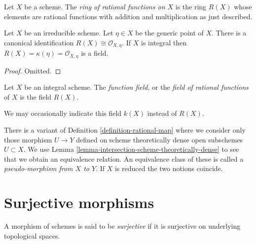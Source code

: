 \begin{definition}
\label{definition-ring-of-rational-functions}
Let $X$ be a scheme. The {\it ring of rational functions on $X$}
is the ring $R(X)$ whose elements are rational functions with
addition and multiplication as just described.
\end{definition}

\begin{lemma}
\label{lemma-integral-scheme-rational-functions}
Let $X$ be an irreducible scheme. Let $\eta \in X$ be the generic point
of $X$. There is a canonical identification
$R(X) \cong \mathcal{O}_{X, \eta}$. If $X$ is integral then
$R(X) = \kappa(\eta) = \mathcal{O}_{X, \eta}$ is
a field.
\end{lemma}

\begin{proof}
Omitted.
\end{proof}

\begin{definition}
\label{definition-function-field}
Let $X$ be an integral scheme.
The {\it function field}, or the {\it field of rational functions}
of $X$ is the field $R(X)$.
\end{definition}

\noindent
We may occasionally indicate this field $k(X)$ instead of $R(X)$.

\begin{remark}
\label{remark-pseudo-morphisms}
There is a variant of Definition \ref{definition-rational-map}
where we consider only those morphism $U \to Y$ defined on
scheme theoretically dense open subschemes $U \subset X$.
We use Lemma \ref{lemma-intersection-scheme-theoretically-dense}
to see that we obtain an equivalence relation.
An equivalence class of these is called a
{\it pseudo-morphism from $X$ to $Y$}.
If $X$ is reduced the two notions coincide.
\end{remark}









\section{Surjective morphisms}
\label{section-surjective}

\begin{definition}
\label{definition-surjective}
A morphism of schemes is said to be {\it surjective}
if it is surjective on underlying topological
spaces.
\end{definition}

